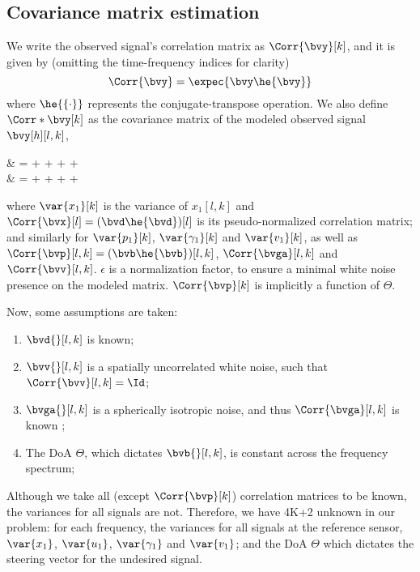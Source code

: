\subsection{Covariance matrix estimation}
We write the observed signal's correlation matrix as $\Corr{\bvy}[k]$, and it is given by (omitting the time-frequency indices for clarity)
\begin{equation}
	\Corr{\bvy} = \expec{\bvy \he{\bvy}}
\end{equation}
where $\he{\{\cdot\}}$ represents the conjugate-transpose operation. We also define $\Corr*{\bvy}[k]$ as the covariance matrix of the modeled observed signal $\bvy[h][l,k]$,
\begin{equations}
	\Corr*{\bvy}
	& = \bvd \he{\bvd}  + \bvb \he{\bvb}  + \Corr{\bvga}  + \Corr{\bvv}  + \epsilon\Id \\
	& = \Corr{\bvx}  + \Corr{\bvp}  + \Corr{\bvga}  + \Corr{\bvv}  + \epsilon\Id
\end{equations}
where $\var{x_1}[k]$ is the variance of $x_1[l,k]$ and $\Corr{\bvx}[l] = (\bvd \he{\bvd})[l]$ is its pseudo-normalized correlation matrix; and similarly for $\var{p_1}[k]$, $\var{\gamma_1}[k]$ and $\var{v_1}[k]$, as well as
$\Corr{\bvp}[l,k] = (\bvb \he{\bvb})[l,k]$, $\Corr{\bvga}[l,k]$ and $\Corr{\bvv}[l,k]$. $\epsilon$ is a normalization factor, to ensure a minimal white noise presence on the modeled matrix. $\Corr{\bvp}[k]$ is implicitly a function of $\Theta$.

Now, some assumptions are taken:
\begin{enumerate}
	\item $\bvd{}[l,k]$ is known;
	\item $\bvv{}[l,k]$ is a spatially uncorrelated white noise, such that $\Corr{\bvv}[l,k] = \Id$;
	\item $\bvga{}[l,k]$ is a spherically isotropic noise, and thus $\Corr{\bvga}[l,k]$ is known \cite{epain_spherical_2016};
	\item The DoA $\Theta$, which dictates $\bvb{}[l,k]$, is constant across the frequency spectrum;
\end{enumerate}

Although we take all (except $\Corr{\bvp}[k]$) correlation matrices to be known, the variances for all signals are not. Therefore, we have 4K+2 unknown in our problem: for each frequency, the variances for all signals at the reference sensor, $\var{x_1}$, $\var{u_1}$, $\var{\gamma_1}$ and $\var{v_1}$; and the DoA $\Theta$ which dictates the steering vector for the undesired signal.


